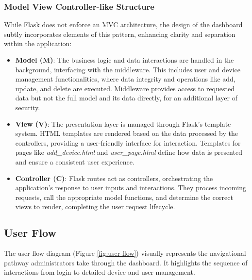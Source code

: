 \subsubsection{Model View Controller-like Structure}
While Flask does not enforce an MVC architecture, the design of the dashboard subtly incorporates elements of this pattern, enhancing clarity and separation within the application:

\begin{itemize}
    \item \textbf{Model (M)}: The business logic and data interactions are handled in the background, interfacing with the middleware. This includes user and device management functionalities, where data integrity and operations like add, update, and delete are executed. Middleware provides access to requested data but not the full model and its data directly, for an additional layer of security. 
    \item \textbf{View (V)}: The presentation layer is managed through Flask’s template system. HTML templates are rendered based on the data processed by the controllers, providing a user-friendly interface for interaction. Templates for pages like \textit{add\_device.html} and \textit{user\_page.html} define how data is presented and ensure a consistent user experience.
    \item \textbf{Controller (C)}: Flask routes act as controllers, orchestrating the application's response to user inputs and interactions. They process incoming requests, call the appropriate model functions, and determine the correct views to render, completing the user request lifecycle.
\end{itemize}

\newpage
\subsection{User Flow}
The user flow diagram (Figure \ref{fig:user-flow}) visually represents the navigational pathway administrators take through the dashboard. It highlights the sequence of interactions from login to detailed device and user management.

